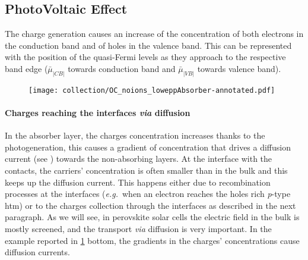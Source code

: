 	\subsection{PhotoVoltaic Effect}
	The charge generation causes an increase of the concentration of both electrons in the conduction band and of holes in the valence band.
	This can be represented with the position of the quasi\hyp{}Fermi levels as they approach to the respective band edge ($\bar\mu_|CB|$ towards conduction band and $\bar\mu_|VB|$ towards valence band).
	
	
	\begin{figure}
		\centering
		\texttt{[image: collection/OC\_noions\_loweppAbsorber-annotated.pdf]}
		\label{fig:collection}
	\end{figure}
	
		\paragraph{Charges reaching the interfaces \textsl{via} diffusion}
		In the absorber layer, the charges concentration increases thanks to the photogeneration, this causes a gradient of concentration that drives a diffusion current (see ) towards the non\hyp{}absorbing layers.
		At the interface with the contacts, the carriers' concentration is often smaller than in the bulk and this keeps up the diffusion current.
		This happens either due to recombination processes at the interfaces (\textsl{e.g.}\ when an electron reaches the holes rich \textit{p}-type \gls{htm}) or to the charges collection through the interfaces as described in the next paragraph.
		As we will see, in perovskite solar cells the electric field in the bulk is mostly screened, and the transport \textsl{via} diffusion is very important.
		In the example reported in \cref{fig:collection} bottom, the gradients in the charges' concentrations cause diffusion currents.
		
